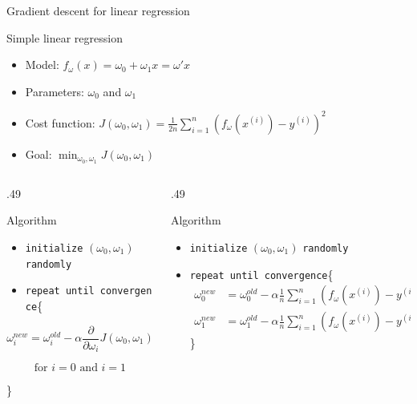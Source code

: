 \documentclass[
  9pt,
  ignorenonframetext,
  aspectratio=169,
  t, dvipsnames]{beamer}
\providecommand{\tightlist}{%
  \setlength{\itemsep}{0pt}\setlength{\parskip}{0pt}}\usepackage{longtable,booktabs,array}
\theoremstyle{definition}
\def\begincols{\begin{columns}}
\def\begincol{\begin{column}}
\def\endcol{\end{column}}
\def\endcols{\end{columns}}
\begin{document}
\begin{frame}[fragile]{Gradient descent for linear regression}
\protect\hypertarget{gradient-descent-for-linear-regression}{}
\begin{block}{Simple linear regression}

\begin{itemize}
\tightlist
\item
  Model: \(f_{\omega}(x) = \omega_0 + \omega_1 x = \omega'x\)
\item
  Parameters: \(\omega_0\) and \(\omega_1\)
\item
  Cost function:
  \(J(\omega_0,\omega_1) = \frac{1}{2 n} \sum_{i=1}^{n}\left(f_{\omega}\left(x^{(i)}\right)-y^{(i)}\right)^{2}\)
\item
  Goal: \(\min_{\omega_0,\omega_1} J(\omega_0,\omega_1)\)
\end{itemize}

\end{block}

\begincols
\begincol{.49\textwidth}

\begin{alertblock}{Algorithm}

\begin{itemize}
\tightlist
\item
  \texttt{initialize} \((\omega_0,\omega_1)\) \texttt{randomly}
\item
  \texttt{repeat\ until\ convergence}\{
\end{itemize}

\[\omega_i^{new} = \omega_i^{old} - \alpha \frac{\partial }{\partial \omega_i} J(\omega_0, \omega_1)\]

\[\text{for } i = 0 \text{ and } i=1\]

\}

\end{alertblock}

\endcol

\begincol{.49\textwidth}

\begin{alertblock}{Algorithm}

\begin{itemize}
\tightlist
\item
  \texttt{initialize} \((\omega_0,\omega_1)\) \texttt{randomly}
\item
  \texttt{repeat\ until\ convergence}\{ \begin{align*}
  \omega_0^{new} &= \omega_0^{old} - \alpha \frac{1}{n} \sum_{i=1}^{n}\left(f_{\omega}\left(x^{(i)}\right)-y^{(i)}\right) \\
  \omega_1^{new} &= \omega_1^{old} - \alpha \frac{1}{n} \sum_{i=1}^{n}\left(f_{\omega}\left(x^{(i)}\right)-y^{(i)}\right).x^{(i)}
  \end{align*} \}
\end{itemize}

\end{alertblock}

\endcol
\endcols
\end{frame}
\end{document}
